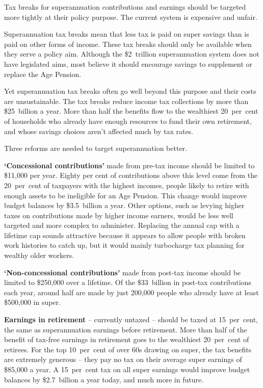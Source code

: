 

\setlength{\overviewextra}{2pt}
\addtolength{\columnsep}{\overviewextra}
\begin{overview}[-25pt]
\label{overview:SUPER}
Tax breaks for superannuation contributions and earnings should be targeted more tightly at their policy purpose. The current system is expensive and unfair. 

Superannuation tax breaks mean that less tax is paid on super savings than is paid on other forms of income. These tax breaks should only be available when they serve a policy aim. Although the \$2~trillion superannuation system does not have legislated aims, most believe it should encourage savings to supplement or replace the Age Pension. 

Yet superannuation tax breaks often go well beyond this purpose and their costs are unsustainable. The tax breaks reduce income tax collections by more than \$25~billion a year. More than half the benefits flow to the wealthiest 20~per~cent of households who already have enough resources to fund their own retirement, and whose savings choices aren’t affected much by tax rates. 

Three reforms are needed to target superannuation better.

\textbf{‘Concessional contributions’} made from pre-tax income should be limited to \$11,000 per year. Eighty per cent of contributions above this level come from the 20~per~cent of taxpayers with the highest incomes, people likely to retire with enough assets to be ineligible for an Age Pension. This change would improve budget balances by \$3.5~billion a year. Other options, such as levying higher taxes on contributions made by higher income earners, would be less well targeted and more complex to administer. Replacing the annual cap with a lifetime cap sounds attractive because it appears to allow people with broken work histories to catch up, but it would mainly turbocharge tax planning for wealthy older workers.

\textbf{‘Non-concessional contributions’} made from post-tax income
should be limited to \$250,000 over a lifetime. Of the \$33~billion in
post-tax contributions each year, around half are made by just
200,000 people who already have at least \$500,000 in super.


\textbf{Earnings in retirement} – currently untaxed – should be taxed at 15~per~cent, the same as superannuation earnings before retirement. More than half of the benefit of tax-free earnings in retirement goes to the wealthiest 20~per~cent of retirees. For the top 10~per~cent of over 60s drawing on super, the tax benefits are extremely generous – they pay no tax on their average super earnings of \$85,000 a year. A 15~per~cent tax on all super earnings would improve budget balances by {\$2.7~billion} a year today, and much more in future. 


\end{overview}
